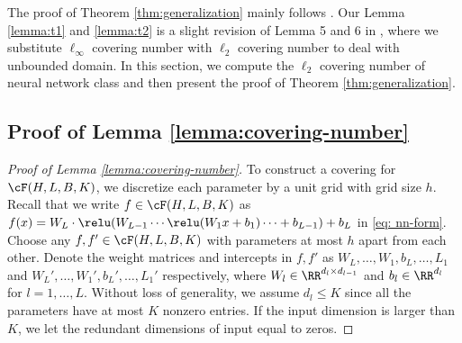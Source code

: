 The proof of Theorem \ref{thm:generalization} mainly follows \citet{chen2022nonparametric}. Our Lemma \ref{lemma:t1} and \ref{lemma:t2} is a slight revision of Lemma 5 and 6 in \citet{chen2022nonparametric}, where we substitute $\ell_\infty$ covering number with $\ell_2$ covering number to deal with unbounded domain. In this section, we compute the $\ell_2$ covering number of neural network class and then present the proof of  Theorem \ref{thm:generalization}.

\subsection{Proof of Lemma \ref{lemma:covering-number}}
\begin{proof}[Proof of Lemma \ref{lemma:covering-number}]
    To construct a covering for $\cF(H,L,B,K)$, we discretize each parameter by a unit grid with grid size $h$. Recall that we write $f \in \cF(H,L,B,K)$ as $f(x) = W_L \cdot \relu (W_{L-1}\cdots \relu(W_1 x +b_1) \cdots +b_{L-1}) +b_L$ in \eqref{eq: nn-form}. Choose any $f,f' \in \cF(H,L,B,K)$ with parameters at most $h$ apart from each other. Denote the weight matrices and intercepts in $f,f'$ as $W_L,\ldots,W_1,b_L,\ldots,L_1$ and $W_L',\ldots,W_1',b_L',\ldots,L_1'$ respectively, where $W_l \in \RR^{{d_l}\times d_{l-1}}$ and $b_l \in \RR^{d_l}$ for $l=1,\ldots,L$. Without loss of generality, we assume $d_l \leq K$ since all the parameters have at most $K$ nonzero entries. If the input dimension is larger than $K$, we let the redundant dimensions of input equal to zeros.
    

\end{proof}
